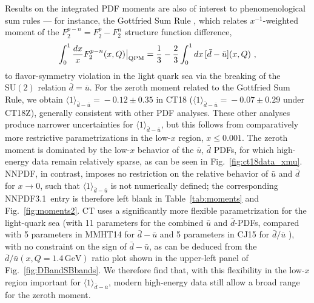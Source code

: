 Results on the integrated PDF moments are also of interest to phenomenological sum rules --- for instance, the Gottfried Sum
Rule \cite{Gottfried:1967kk}, which relates $x^{-1}$-weighted moment of the $F^{p-n}_2 = F^{p}_2\! -\! F^{n}_2$ structure function difference,
\begin{equation}
\int_0^1\frac{dx}{x}F^{p-n}_2(x,Q)\big|_\mathrm{QPM} =\frac{1}{3} - \frac{2}{3}\int_{0}^{1} dx\, [\bar{d}-\bar{u}](x,Q)\ ,
\label{eq:Gott}
\end{equation}
to flavor-symmetry violation in the light quark sea via the breaking of the $\mathrm{SU}(2)$ relation
$\overline{d} = \overline{u}$.
For the zeroth moment related to the Gottfried Sum Rule, we obtain $\langle 1 \rangle_{\bar{d}-\bar{u}}\! =\! -0.12\!\pm\!0.35$ in CT18
($\langle 1 \rangle_{\bar{d}-\bar{u}}\! =\! -0.07\!\pm\!0.29$ under CT18Z), generally consistent with other PDF analyses. These other
analyses produce narrower uncertainties for $\langle 1 \rangle_{\bar{d}-\bar{u}}$, but this follows from comparatively
more restrictive parametrizations in the low-$x$ region, $x\! \le\! 0.001$. The zeroth moment is dominated by the low-$x$ behavior
of the $\bar{u},\,\bar{d}$ PDFs, for which high-energy data remain relatively sparse, as can be seen in Fig.~\ref{fig:ct18data_xmu}.
NNPDF, in contrast, imposes no restriction on the relative behavior of $\bar{u}$ and $\bar{d}$ for $x \to 0$, such that
$\langle 1 \rangle_{\bar{d}-\bar{u}}$ is not numerically defined; the corresponding NNPDF3.1~entry is therefore left blank in Table~\ref{tab:moments}
and Fig.~\ref{fig:moments2}.
CT uses a significantly more flexible parametrization for the light-quark sea (with 11 parameters for the combined $\bar{u}$ and $\bar{d}$-PDFs,
compared with 5 parameters in MMHT14 for $\bar{d}-\bar{u}$ \cite{Harland-Lang:2014zoa} and 5 parameters in CJ15 for $\bar{d}/\bar{u}$ \cite{Accardi:2016qay}),
with no constraint on the sign of $\bar{d}\!-\!\bar{u}$, as can be deduced from the $\bar{d}/\bar{u}(x,Q\!=\! 1.4\,\mathrm{GeV})$ ratio plot shown in the upper-left
panel of Fig.~\ref{fig:DBandSBbands}. We therefore find that, with this flexibility in the low-$x$ region important for
$\langle 1 \rangle_{\bar{d}-\bar{u}}$, modern high-energy data still allow a broad range for the zeroth moment.


